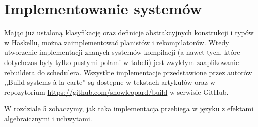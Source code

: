 \section{Implementowanie systemów}

Mając już ustaloną klasyfikację oraz definicje abstrakcyjnych konstrukcji i typów w Haskellu, można zaimplementować planistów i rekompilatorów. Wtedy utworzenie implementacji znanych systemów kompilacji (a nawet tych, które dotychczas były tylko pustymi polami w tabeli) jest zwykłym zaaplikowanie rebuildera do schedulera. Wszystkie implementacje przedstawione przez autorów ,,Build systems {\`a} la carte'' są dostępne w tekstach artykułów \cite{mokhov2018build, mokhov2020build} oraz w repozytorium \url{https://github.com/snowleopard/build} w serwisie GitHub.

W rozdziale 5 zobaczymy, jak taka implementacja przebiega w języku z efektami algebraicznymi i uchwytami.
